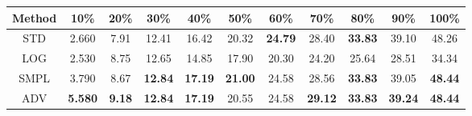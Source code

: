 \documentclass{standalone}
\begin{document}
\begin{tabular}{c|cccccccccc}
      \toprule
      Method & 10\% & 20\% & 30\% & 40\% & 50\% & 60\% & 70\% & 80\% & 90\% & 100\% \\
      \midrule
STD & 2.660 & 7.91 & 12.41 & 16.42 & 20.32 & \textbf{24.79} & 28.40 & \textbf{33.83} & 39.10 & 48.26\\
LOG & 2.530 & 8.75 & 12.65 & 14.85 & 17.90 & 20.30 & 24.20 & 25.64 & 28.51 & 34.34\\
SMPL & 3.790 & 8.67 & \textbf{12.84} & \textbf{17.19} & \textbf{21.00} & 24.58 & 28.56 & \textbf{33.83} & 39.05 & \textbf{48.44}\\
ADV & \textbf{5.580} & \textbf{9.18} & \textbf{12.84} & \textbf{17.19} & 20.55 & 24.58 & \textbf{29.12} & \textbf{33.83} & \textbf{39.24} & \textbf{48.44}\\
  \bottomrule
\end{tabular}
\end{document}
